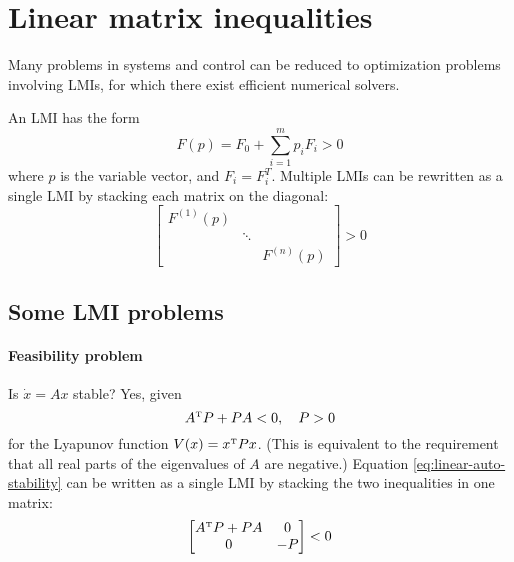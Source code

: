 \section{Linear matrix inequalities}
Many problems in systems and control can be reduced to optimization problems involving LMIs, for which there exist efficient numerical solvers.

An LMI has the form
%
\begin{equation}
  F(p) = F_0 + \sum_{i=1}^m p_i F_i > 0
\end{equation}
%
where $p$ is the variable vector, and $F_i = F_i^T$. Multiple LMIs can be rewritten as a single LMI by stacking each matrix on the diagonal:
%
\begin{equation}
  \begin{bmatrix}
    F^{(1)}(p) &&\\
    & \ddots &\\
    && F^{(n)}(p)
  \end{bmatrix} > 0
\end{equation}

\subsection{Some LMI problems}
\paragraph{Feasibility problem} Is $\dot{x} = Ax$ stable? Yes, given
%
\begin{equation}\label{eq:linear-auto-stability}
  A\tp P + PA < 0,\quad P > 0
\end{equation}
%
for the Lyapunov function $V(x) = x\tp P x$. (This is equivalent to the requirement that all real parts of the eigenvalues of $A$ are negative.) Equation \eqref{eq:linear-auto-stability} can be written as a single LMI by stacking the two inequalities in one matrix:
%
\begin{equation}
  \begin{bmatrix}
    A\tp P + PA & 0 \\
    0 & -P
  \end{bmatrix}
  < 0
\end{equation}

